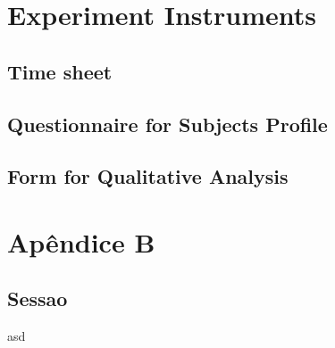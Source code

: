 \chapter{Experiment Instruments}
\label{ap:measurement-instruments}

\section{Time sheet}
\label{ap:sec:time-sheet}

\section{Questionnaire for Subjects Profile}
\label{ap:sec:profile}

\newpage
\section{Form for Qualitative Analysis}
\label{ap:sec:feedback}

\chapter{Apêndice B}
\label{ap:instruments}
\newpage
\section{Sessao}
\label{ap:sec:asd}
asd

